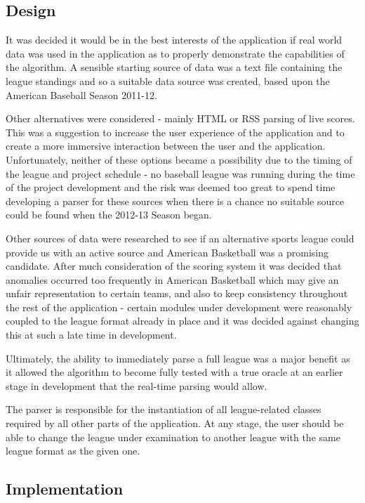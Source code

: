 \subsection{Design}

It was decided it would be in the best interests of the application if
real world data was used in the application as to properly demonstrate
the capabilities of the algorithm. A sensible starting source of data
was a text file containing the league standings and so a suitable data
source was created, based upon the American Baseball Season
2011-12.

Other alternatives were considered - mainly HTML or RSS parsing of
live scores. This was a suggestion to increase the user experience of
the application and to create a more immersive interaction between the
user and the application. Unfortunately, neither of these options
became a possibility due to the timing of the league and project
schedule - no baseball league was running during the time of the
project development and the risk was deemed too great to spend time
developing a parser for these sources when there is a chance no
suitable source could be found when the 2012-13 Season began.

Other sources of data were researched to see if an alternative sports
league could provide us with an active source and American Basketball
was a promising candidate. After much consideration of the scoring
system it was decided that anomalies occurred too frequently in
American Basketball which may give an unfair representation to
certain teams, and also to keep consistency throughout the rest of the
application - certain modules under development were reasonably
coupled to the league format already in place and it was decided
against changing this at such a late time in development.

Ultimately, the ability to immediately parse a full league was a major
benefit as it allowed the algorithm to become fully tested with a true
oracle at an earlier stage in development that the real-time parsing
would allow.

The parser is responsible for the instantiation of all league-related
classes required by all other parts of the application. At any stage,
the user should be able to change the league under examination to
another league with the same league format as the given one. 

\subsection{Implementation}

